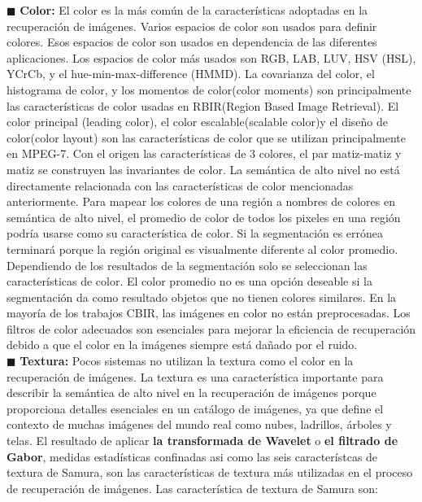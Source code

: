 \documentclass{llncs}
\begin{document}
$\blacksquare$  \textbf{Color:} El color es la m\'as com\'un de la caracter\'isticas adoptadas en la recuperaci\'on de im\'agenes. Varios espacios de color son usados 
para definir colores. Esos espacios de color son usados en dependencia de las diferentes aplicaciones. Los espacios de color 
m\'as usados son  RGB, LAB, LUV, HSV (HSL), YCrCb, y el hue-min-max-difference (HMMD). La covarianza del color, el histograma 
de color, y los momentos de color(color moments) son principalmente las caracter\'isticas de color usadas en RBIR(Region Based Image Retrieval).
 El color principal (leading color), el color escalable(scalable color)y el dise\~{n}o de color(color layout) son las caracter\'isticas 
de color que se utilizan principalmente en MPEG-7. Con el origen las caracter\'isticas de 3 colores, el par matiz-matiz y matiz
se construyen las invariantes de color. La sem\'antica de alto nivel no est\'a directamente relacionada con las caracter\'isticas 
de color mencionadas anteriormente. Para mapear los colores de una regi\'on a nombres de colores en sem\'antica de alto nivel,
el promedio de color de todos los pixeles  en una regi\'on podr\'ia usarse como su caracter\'istica de color. Si la segmentaci\'on
es err\'onea terminar\'a porque la regi\'on original es visualmente diferente al color promedio. Dependiendo de los resultados 
de la segmentaci\'on solo se seleccionan las caracter\'isticas de color. El color promedio no es una opci\'on deseable si la
segmentaci\'on da como resultado objetos que no tienen colores similares. En la mayor\'ia de los trabajos CBIR, las im\'agenes en color no
est\'an preprocesadas. Los filtros de color adecuados son esenciales para mejorar la eficiencia de recuperaci\'on debido a que el color 
en la im\'agenes siempre est\'a da\~{n}ado por el ruido.\\
$\blacksquare$  \textbf{Textura:}
Pocos sistemas no utilizan la textura como el color en la recuperaci\'on de im\'agenes. La textura es una caracter\'istica importante 
para describir la sem\'antica de alto nivel en la recuperaci\'on de im\'agenes porque proporciona detalles esenciales en un cat\'alogo 
de im\'agenes, ya que define el contexto de muchas im\'agenes del mundo real como nubes, ladrillos, \'arboles y telas. El resultado
de aplicar \textbf{la transformada de Wavelet}    o \textbf{el filtrado de Gabor}, medidas estad\'isticas confinadas asi como las
seis caracter\'istcas de textura de Samura, son las caracter\'isticas de textura m\'as utilizadas en el proceso de recuperaci\'on de 
im\'agenes.  Las caracter\'istica de textura de Samura son:\\
\end{document}
